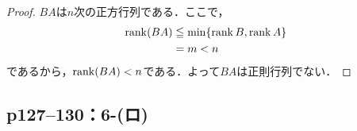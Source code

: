 \documentclass[a4paper,10pt,fleqn]{ltjsarticle}
\begin{document}
\begin{tleftbar}
    \begin{proof}
        $BA$は$n$次の正方行列である．ここで，
        \begin{align*}
            \rank (BA) & \leqq \min \{ \rank B, \rank A \} \\
                       & =  m <n
        \end{align*}
        であるから，$\rank (BA)<n$である．よって$BA$は正則行列でない．
    \end{proof}
\end{tleftbar}


\subsection*{p127--130：6-(ロ)}
\end{document}
